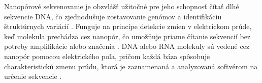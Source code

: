 Nanopórové sekvenovanie je obzvlášť užitočné pre jeho schopnosť čítať dlhé sekvencie DNA, čo zjednodušuje zostavovanie genómov a identifikáciu štruktúrnych variácií \cite{Zheng2023Nanopore,Lopez2019DNA}.
Funguje na princípe detekcie zmien v elektrickom prúde, keď molekula prechádza cez nanopór, čo umožňuje priame čítanie sekvencií bez potreby amplifikácie alebo značenia \cite{Zheng2023Nanopore}.
DNA alebo RNA molekuly sú vedené cez nanopór pomocou elektrického poľa, pričom každá báza spôsobuje charakteristickú zmenu prúdu, ktorá je zaznamenaná a analyzovaná softvérom na určenie sekvencie \cite{Zheng2023Nanopore}.
